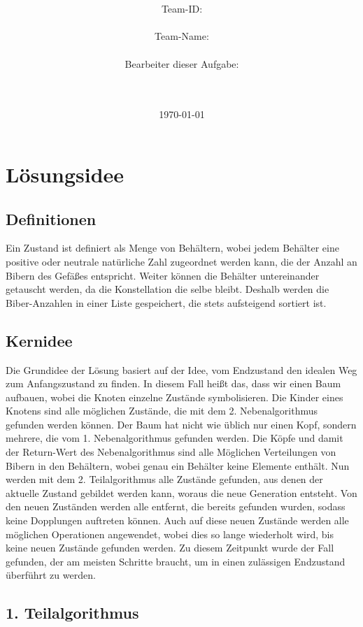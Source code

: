 \documentclass[a4paper,10pt,ngerman]{scrartcl}
\title{\textbf{\Huge\Aufgabe}}
\author{\LARGE Team-ID: \LARGE \TeamID \\\\
	    \LARGE Team-Name: \LARGE \TeamName \\\\
	    \LARGE Bearbeiter dieser Aufgabe: \\ 
	    \LARGE \Namen\\\\}
\date{\LARGE\today}
\begin{document}
\maketitle
\tableofcontents

\vspace{0.5cm}

\section{Lösungsidee}
\subsection{Definitionen}
Ein Zustand ist definiert als Menge von Behältern, wobei jedem Behälter eine positive oder neutrale natürliche Zahl zugeordnet werden kann, die der Anzahl an Bibern des Gefäßes entspricht. Weiter können die Behälter untereinander getauscht werden, da die Konstellation die selbe bleibt. Deshalb werden die Biber-Anzahlen in einer Liste gespeichert, die stets aufsteigend sortiert ist.
\subsection{Kernidee}
Die Grundidee der Lösung basiert auf der Idee, vom Endzustand den idealen Weg zum Anfangszustand zu finden. In diesem Fall heißt das, dass wir einen Baum  aufbauen, wobei die Knoten einzelne Zustände symbolisieren. Die Kinder eines Knotens sind alle möglichen Zustände, die mit dem 2. Nebenalgorithmus gefunden werden können. Der Baum hat nicht wie üblich nur einen Kopf, sondern mehrere, die vom 1. Nebenalgorithmus gefunden werden. Die Köpfe und damit der Return-Wert des Nebenalgorithmus sind alle Möglichen Verteilungen von Bibern in den Behältern, wobei genau ein Behälter keine Elemente enthält. Nun werden mit dem 2. Teilalgorithmus alle Zustände gefunden, aus denen der aktuelle Zustand gebildet werden kann, woraus die neue Generation entsteht. Von den neuen Zuständen werden alle entfernt, die bereits gefunden wurden, sodass keine Dopplungen auftreten können. Auch auf diese neuen Zustände werden alle möglichen Operationen angewendet, wobei dies so lange wiederholt wird, bis keine neuen Zustände gefunden werden. Zu diesem Zeitpunkt wurde der Fall gefunden, der am meisten Schritte braucht, um in einen zulässigen Endzustand überführt zu werden.
\subsection{1. Teilalgorithmus}
\end{document}
